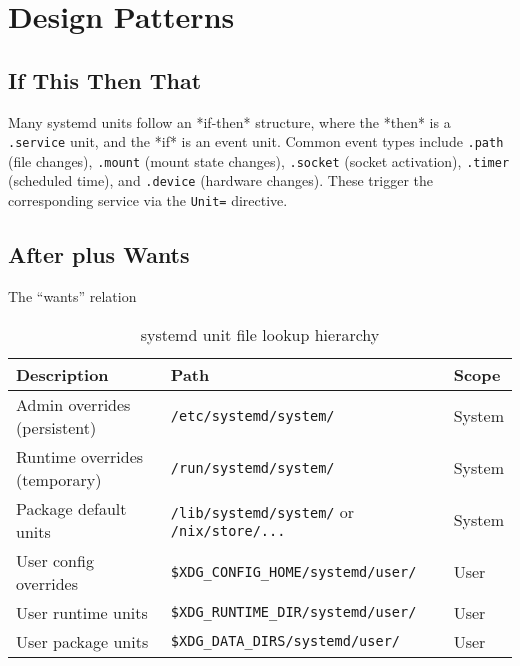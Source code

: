 \documentclass[openany, 12pt]{book}
\begin{document}
\chapter{Design Patterns}
\section{If This Then That}
Many systemd units follow an *if-then* structure, where the *then* is a
\texttt{.service} unit, and the *if* is an event unit. Common event types include
\texttt{.path} (file changes), \texttt{.mount} (mount state changes),
\texttt{.socket} (socket activation), \texttt{.timer} (scheduled time),
and \texttt{.device} (hardware changes). These trigger the corresponding
service via the \texttt{Unit=} directive.

\section{After plus Wants}
The ``wants'' relation

\begin{table}[h]
  \centering
  \begin{tabular}{@{}lll@{}}
    \toprule
    \textbf{Description}          & \textbf{Path}                                            & \textbf{Scope} \\ \midrule
    Admin overrides (persistent)  & \texttt{/etc/systemd/system/}                            & System         \\
    Runtime overrides (temporary) & \texttt{/run/systemd/system/}                            & System         \\
    Package default units         & \texttt{/lib/systemd/system/} or \texttt{/nix/store/...} & System         \\
    User config overrides         & \texttt{\$XDG\_CONFIG\_HOME/systemd/user/}               & User           \\
    User runtime units            & \texttt{\$XDG\_RUNTIME\_DIR/systemd/user/}               & User           \\
    User package units            & \texttt{\$XDG\_DATA\_DIRS/systemd/user/}                 & User           \\
    \bottomrule
  \end{tabular}
  \caption{systemd unit file lookup hierarchy}
\end{table}
\end{document}
